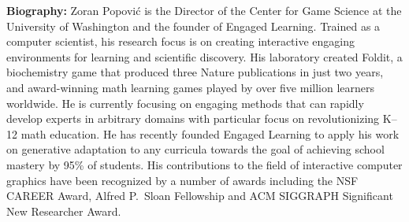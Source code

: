 {\bfseries Biography:} Zoran Popović is the Director of the Center for
Game Science at the University
of Washington and the founder of Engaged Learning.  Trained as a computer
scientist, his research focus is on creating interactive engaging
environments for learning and scientific discovery.  His laboratory created
Foldit, a biochemistry game that produced three Nature publications in just
two years, and award-winning math learning games played by over five million
learners worldwide.  He is currently focusing on engaging methods that can
rapidly develop experts in arbitrary domains with particular focus on
revolutionizing K--12 math education.  He has recently founded Engaged
Learning to apply his work on generative adaptation to any curricula towards
the goal of achieving school mastery by 95\% of students.  His contributions
to the field of interactive computer graphics have been recognized by a
number of awards including the NSF CAREER Award, Alfred P.\ Sloan Fellowship
and ACM SIGGRAPH Significant New Researcher Award.

\newpage

